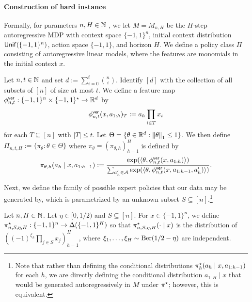 \paragraph{Construction of hard instance} Formally, for parameters $n,H \in \mathbb{N}$
, we let $M = M_{n,H}$ be the $H$-step autoregressive MDP with context space $\{-1,1\}^n$, initial context distribution $\mathsf{Unif}(\{-1,1\}^n)$, action space $\{-1,1\}$, and horizon $H$. We define a policy class $\Pi$ consisting of autoregressive linear models, where the features are monomials in the initial context $x$.



\begin{definition}\label{def:comp-lb-policy-class}
Let $n,t \in \mathbb{N}$ and set $d := \sum_{i=0}^t \binom{n}{i}$. Identify $[d]$ with the collection of all subsets of $[n]$ of size at most $t$. We define a feature map $\phi^{\mathsf{ver}}_{n,t}: \{-1,1\}^n \times \{-1,1\}^\star \to \mathbb{R}^d$ by 
\[\phi^{\mathsf{ver}}_{n,t}(x,a_{1:h})_T := a_h \prod_{i \in T} x_i\]
for each $T \subseteq [n]$ with $|T| \leq t$. Let $\Theta = \{\theta \in \mathbb{R}^d:\left \lVert \theta \right \rVert_1 \leq 1\}$. We then define $\Pi_{n,t,H} := \{\pi_\theta:\theta\in\Theta\}$ where $\pi_\theta = (\pi_{\theta,h})_{h=1}^H$ is defined by
\begin{equation}
  \pi_{\theta,h}(a_h\mid{}x,a_{1:h-1}) := \frac{\exp(\langle \theta,
    \phi^{\mathsf{ver}}_{n,t}(x,a_{1:h})\rangle)}{\sum_{a'_h \in \mathcal{A}}
    \exp(\langle \theta,\phi^{\mathsf{ver}}_{n,t}(x,a_{1:h-1},a'_h)\rangle)}.
    \label{eq:comp-lb-density}
\end{equation}
\end{definition}

Next, we define the family of possible expert policies that our data may be generated by, which is parametrized by an unknown subset $S \subseteq [n]$.\footnote{Note that rather than defining the conditional distributions $\pi^{\star}_h(a_h\mid{}x,a_{1:h-1})$ for each $h$, we are directly defining the conditional distribution $a_{1:H}\mid{} x$ that would be generated autoregressively in $M$ under $\pi^{\star}$; however, this is equivalent.}

\begin{definition}
  \label{def:parity_policy}
Let $n,H \in \mathbb{N}$. Let $\eta \in [0,1/2)$ and $S \subseteq [n]$. For $x \in \{-1,1\}^n$, we define $\pi^\star_{n,S,\eta,H}: \{-1,1\}^n \to \Delta(\{-1,1\}^H)$ so that $\pi^\star_{n,S,\eta,H}(\cdot\mid{}x)$ is the distribution of $\left((-1)^{\xi_h}\prod_{j \in S} x_j\right)_{h=1}^H$, where $\xi_1,\dots,\xi_H \sim \mathrm{Ber}(1/2-\eta)$ are independent.
\end{definition}

